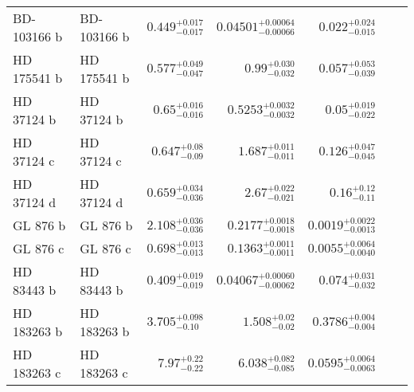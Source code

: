 \begin{longtable*}{llrrrrr}
BD-103166 b & BD-103166 b & $0.449^{+0.017}_{-0.017}$ & $0.04501^{+0.00064}_{-0.00066}$ & $0.022^{+0.024}_{-0.015}$ & \cite{Butler00} & \\
HD 175541 b & HD 175541 b & $0.577^{+0.049}_{-0.047}$ & $0.99^{+0.030}_{-0.032}$ & $0.057^{+0.053}_{-0.039}$ & \cite{Johnson07} & \\
HD 37124 b & HD 37124 b & $0.65^{+0.016}_{-0.016}$ & $0.5253^{+0.0032}_{-0.0032}$ & $0.05^{+0.019}_{-0.022}$ & \cite{Butler03} & \\
HD 37124 c & HD 37124 c & $0.647^{+0.08}_{-0.09}$ & $1.687^{+0.011}_{-0.011}$ & $0.126^{+0.047}_{-0.045}$ & \cite{Butler03} & \\
HD 37124 d & HD 37124 d & $0.659^{+0.034}_{-0.036}$ & $2.67^{+0.022}_{-0.021}$ & $0.16^{+0.12}_{-0.11}$ & \cite{Vogt05} & \\
GL 876 b & GL 876 b & $2.108^{+0.036}_{-0.036}$ & $0.2177^{+0.0018}_{-0.0018}$ & $0.0019^{+0.0022}_{-0.0013}$ & \cite{Marcy01} & \\
GL 876 c & GL 876 c & $0.698^{+0.013}_{-0.013}$ & $0.1363^{+0.0011}_{-0.0011}$ & $0.0055^{+0.0064}_{-0.0040}$ & \cite{Marcy01} & \\
HD 83443 b & HD 83443 b & $0.409^{+0.019}_{-0.019}$ & $0.04067^{+0.00060}_{-0.00062}$ & $0.074^{+0.031}_{-0.032}$ & \cite{Butler02} & \\
HD 183263 b & HD 183263 b & $3.705^{+0.098}_{-0.10}$ & $1.508^{+0.02}_{-0.02}$ & $0.3786^{+0.004}_{-0.004}$ & \cite{Marcy05} & \\
HD 183263 c & HD 183263 c & $7.97^{+0.22}_{-0.22}$ & $6.038^{+0.082}_{-0.085}$ & $0.0595^{+0.0064}_{-0.0063}$ & \cite{Wright09} & \\
\bottomrule
\end{longtable*}
